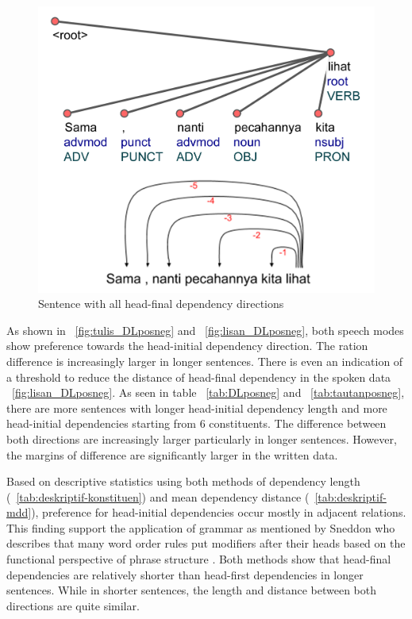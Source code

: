 \documentclass[10pt, a4paper, conference, compsocconf]{IEEEtran}
\begin{document}
\begin{figure}
  \centering
  \includegraphics[width=0.7\linewidth]{pics/ls7375.jpg} 
	\caption{Sentence with all head-final dependency directions}
	\label{fig:ls7375} 
\end{figure}

As shown in \pic~\ref{fig:tulis_DLposneg} and \pic~\ref{fig:lisan_DLposneg}, both speech modes show preference towards the head-initial dependency direction. The ration difference is increasingly larger in longer sentences. There is even an indication of a threshold to reduce the distance of head-final dependency in the spoken data \pic~\ref{fig:lisan_DLposneg}. As seen in table \tab~\ref{tab:DLposneg} and \tab~\ref{tab:tautanposneg}, there are more sentences with longer head-initial dependency length and more head-initial dependencies starting from 6 constituents. The difference between both directions are increasingly larger particularly in longer sentences. However, the margins of difference are significantly larger in the written data. 

Based on descriptive statistics using both methods of dependency length (\tab~\ref{tab:deskriptif-konstituen}) and mean dependency distance (\tab~\ref{tab:deskriptif-mdd}), preference for head-initial dependencies occur mostly in adjacent relations. This finding support the application of grammar as mentioned by Sneddon who describes that many word order rules put modifiers after their heads based on the functional perspective of phrase structure \cite{sneddon2010indonesian}.  Both methods show that head-final dependencies are relatively shorter than head-first dependencies in longer sentences. While in shorter sentences, the length and distance between both directions are quite similar.
\end{document}
